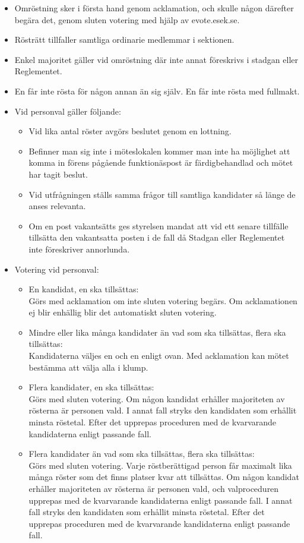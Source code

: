 \documentclass[2019-vm-handlingar.tex]{subfiles}
\begin{document}
    \begin{itemize}
    \item Omröstning sker i första hand genom acklamation, och skulle någon därefter begära det, genom sluten votering med hjälp av evote.esek.se.   
    \item Rösträtt tillfaller samtliga ordinarie medlemmar i sektionen.%
    \item Enkel majoritet gäller vid omröstning där inte annat föreskrivs i stadgan eller Reglementet. 
    \item En får inte rösta för någon annan än sig själv. En får inte rösta med fullmakt.
    \item Vid personval gäller följande:
        
        \begin{itemize}
        \item Vid lika antal röster avgörs beslutet genom en lottning.
        \item Befinner man sig inte i möteslokalen kommer man inte ha möjlighet att komma in förens pågående funktionäspost är färdigbehandlad och mötet har tagit beslut.  
        \item Vid utfrågningen ställs samma frågor till samtliga kandidater så länge de anses relevanta.
        \item Om en post vakantsätts ges styrelsen mandat att vid ett senare tillfälle tillsätta den vakantsatta posten i de fall då Stadgan eller Reglementet inte föreskriver annorlunda.  
         \end{itemize}
    \item Votering vid personval:
    \begin{itemize}
        \item En kandidat, en ska tillsättas: 
        \\ Görs med acklamation om inte sluten votering begärs. Om acklamationen ej blir enhällig blir det automatiskt sluten votering.
        \item Mindre eller lika många kandidater än vad som ska tillsättas, flera ska tillsättas: 
        \\ Kandidaterna väljes en och en enligt ovan. Med acklamation kan mötet bestämma att välja alla i klump.
        \item Flera kandidater, en ska tillsättas:
        \\ Görs med sluten votering. Om någon kandidat erhåller majoriteten av rösterna är personen vald. I annat fall stryks den kandidaten som erhållit minsta röstetal. Efter det upprepas proceduren med de kvarvarande kandidaterna enligt passande fall.
        \item Flera kandidater än vad som ska tillsättas, flera ska tillsättas:
        \\ Görs med sluten votering. Varje röstberättigad person får maximalt lika många röster som det finns platser kvar att tillsättas. Om någon kandidat erhåller majoriteten av rösterna är personen vald, och valproceduren upprepas med de kvarvarande kandidaterna enligt passande fall. I annat fall stryks den kandidaten som erhållit minsta röstetal. Efter det upprepas proceduren med de kvarvarande kandidaterna enligt passande fall.
       \end{itemize}


\end{itemize}
\end{document}
